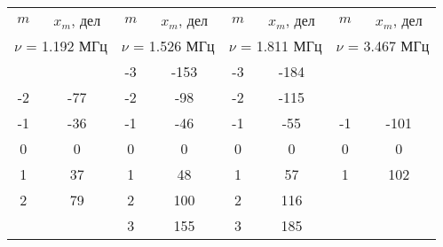 \begin{tabular}{cc|cc|cc|cc}
\toprule
$m$ & $x_m$, дел & $m$ & $x_m$, дел  & $m$ & $x_m$, дел  & $m$ & $x_m$, дел  \\
\multicolumn{2}{c}{$\nu$ = 1.192 МГц} & \multicolumn{2}{c}{$\nu$ = 1.526 МГц} & \multicolumn{2}{c}{$\nu$ = 1.811 МГц} &\multicolumn{2}{c}{$\nu$ = 3.467 МГц}\\
\midrule
   &     & -3 &	-153& -3 & -184  &    &      \\
-2 & -77 & -2 & -98 & -2 & -115	 & 	  &      \\
-1 & -36 & -1 & -46 & -1 &  -55	 & -1 & -101 \\
 0 &   0 &  0 &   0 &  0 &    0	 &  0 &    0 \\
 1 &  37 &  1 &  48 &  1 &   57	 &  1 &  102 \\
 2 &  79 &  2 & 100 &  2 &  116	 & 	  &      \\
   &     &  3 & 155 &  3 &  185  &    &      \\
\bottomrule
\end{tabular}